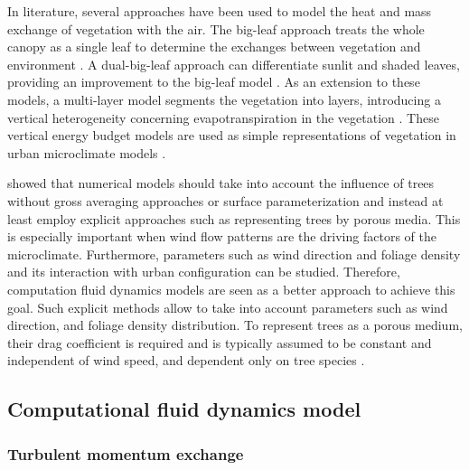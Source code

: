 In literature, several approaches have been used to model the heat and mass exchange of vegetation with the air. The big-leaf approach treats the whole canopy as a single leaf to determine the exchanges between vegetation and environment \citep{2861,Shuttleworth1985,Sellers1996}. A dual-big-leaf approach can differentiate sunlit and shaded leaves, providing an improvement to the big-leaf model \citep{Dai2004}. As an extension to these models, a multi-layer model segments the vegetation into layers, introducing a vertical heterogeneity concerning evapotranspiration in the vegetation \cite{Wang1990,Leuning1998}. These vertical energy budget models are used as simple representations of vegetation in urban microclimate models \citep{Dolman1993,Krayenhoff2014,Ryder2014}. 

\cite{HefnySalim2015} showed that numerical models should take into account the influence of trees without gross averaging approaches or surface parameterization and instead at least employ explicit approaches such as representing trees by porous media. This is especially important when wind flow patterns are the driving factors of the microclimate. Furthermore, parameters such as wind direction and foliage density and its interaction with urban configuration can be studied. Therefore, computation fluid dynamics models are seen as a better approach to achieve this goal. Such explicit methods allow to take into account parameters such as wind direction, and foliage density distribution. To represent trees as a porous medium, their drag coefficient is required and is typically assumed to be constant and independent of wind speed, and dependent only on tree species \citep{Wilson1977}. 

\subsection{Computational fluid dynamics model}

\subsubsection*{Turbulent momentum exchange}
%
%
%
%


